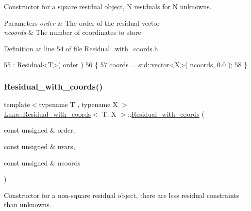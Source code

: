 Constructor for a square residual object, N residuals for N unknowns. 


\begin{DoxyParams}{Parameters}
{\em order} & The order of the residual vector \\
\hline
{\em ncoords} & The number of coordinates to store \\
\hline
\end{DoxyParams}


Definition at line 54 of file Residual\+\_\+with\+\_\+coords.\+h.


\begin{DoxyCode}
55                                                         : Residual<T>( order )
56   \{
57     \hyperlink{classLuna_1_1Residual__with__coords_a3f69e7026c7f86e14bc94ededc86ee62}{coords} = std::vector<X>( ncoords, 0.0 );
58   \}
\end{DoxyCode}
\mbox{\label{classLuna_1_1Residual__with__coords_aae68175ceb4157780d225d5e3d52bbbf}} 
\subsubsection{\texorpdfstring{Residual\+\_\+with\+\_\+coords()}{Residual\_with\_coords()}\hspace{0.1cm}{\footnotesize\ttfamily [2/2]}}
{\footnotesize\ttfamily template$<$typename T , typename X $>$ \\
\hyperlink{classLuna_1_1Residual__with__coords}{Luna\+::\+Residual\+\_\+with\+\_\+coords}$<$ T, X $>$\+::\hyperlink{classLuna_1_1Residual__with__coords}{Residual\+\_\+with\+\_\+coords} (\begin{DoxyParamCaption}\item[{const unsigned \&}]{order,  }\item[{const unsigned \&}]{nvars,  }\item[{const unsigned \&}]{ncoords }\end{DoxyParamCaption})}



Constructor for a non-\/square residual object, there are less residual constraints than unknowns. 


